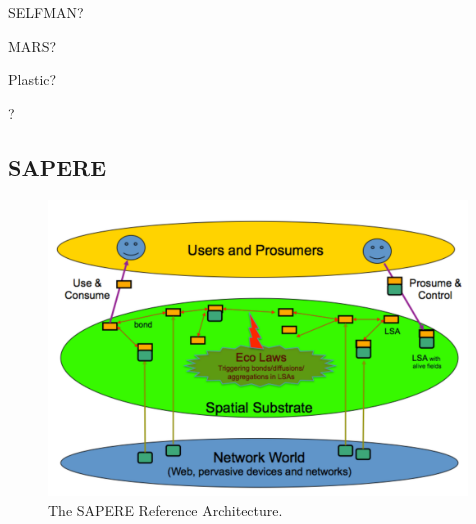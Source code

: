\documentclass[12pt,a4paper,twoside,openright]{book}
\begin{document}
SELFMAN? \cite{selfman}

MARS?

Plastic? \cite{plastic}

\cartago{}? \cite{RPV-JAAMAS2011}

\subsection{SAPERE}
\begin{figure}
\centering
\includegraphics[width=0.99\textwidth]{img/architecture_2.pdf}
\caption{The SAPERE Reference Architecture.}
\label{img:sapere-architecture}
\end{figure}
\end{document}
